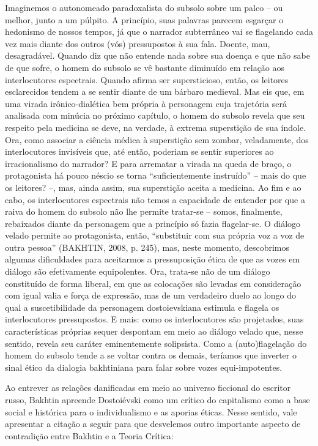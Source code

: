 Imaginemos o autonomeado paradoxalista do subsolo sobre um palco -- ou
melhor, junto a um púlpito. A princípio, suas palavras parecem esgarçar
o hedonismo de nossos tempos, já que o narrador subterrâneo vai se
flagelando cada vez mais diante dos outros (vós) pressupostos à sua
fala. Doente, mau, desagradável. Quando diz que não entende nada sobre
sua doença e que não sabe de que sofre, o homem do subsolo se vê
bastante diminuído em relação aos interlocutores espectrais. Quando
afirma ser supersticioso, então, os leitores esclarecidos tendem a se
sentir diante de um bárbaro medieval. Mas eis que, em uma virada
irônico-dialética bem própria à personagem cuja trajetória será
analisada com minúcia no próximo capítulo, o homem do subsolo revela que
seu respeito pela medicina se deve, na verdade, à extrema superstição de
sua índole. Ora, como associar a ciência médica à superstição sem
zombar, veladamente, dos interlocutores invisíveis que, até então,
poderiam se sentir superiores ao irracionalismo do narrador? E para
arrematar a virada na queda de braço, o protagonista há pouco néscio se
torna ``suficientemente instruído'' -- mais do que os leitores? --, mas,
ainda assim, sua superstição aceita a medicina. Ao fim e ao cabo, os
interlocutores espectrais não temos a capacidade de entender por que a
raiva do homem do subsolo não lhe permite tratar-se -- somos,
finalmente, rebaixados diante da personagem que a princípio só fazia
flagelar-se. O diálogo velado permite ao protagonista, então,
``substituir com sua própria voz a voz de outra pessoa'' (BAKHTIN, 2008,
p. 245), mas, neste momento, descobrimos algumas dificuldades para
aceitarmos a pressuposição ética de que as vozes em diálogo são
efetivamente equipolentes. Ora, trata-se não de um diálogo constituído
de forma liberal, em que as colocações são levadas em consideração com
igual valia e força de expressão, mas de um verdadeiro duelo ao longo do
qual a suscetibilidade da personagem dostoievskiana estimula e flagela
os interlocutores pressupostos. E mais: como os interlocutores são
projetados, suas características próprias sequer despontam em meio ao
diálogo velado que, nesse sentido, revela seu caráter eminentemente
solipsista. Como a (auto)flagelação do homem do subsolo tende a se
voltar contra os demais, teríamos que inverter o sinal ético da dialogia
bakhtiniana para falar sobre vozes equi-impotentes.

Ao entrever as relações danificadas em meio ao universo ficcional do
escritor russo, Bakhtin apreende Dostoiévski como um crítico do
capitalismo como a base social e histórica para o individualismo e as
aporias éticas. Nesse sentido, vale apresentar a citação a seguir para
que desvelemos outro importante aspecto de contradição entre Bakhtin e a
Teoria Crítica:

